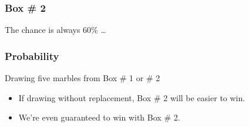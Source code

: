\documentclass[handout]{beamer}
\begin{document}


   \begin{frame}
   \frametitle{Box \# 2}
   \begin{center}
   \end{center}
   The chance is always 60\% \dots
   \end{frame}


   \begin{frame} \frametitle{Probability}

   \begin{block}
   {Drawing five marbles from Box \# 1 or \# 2}
   \begin{itemize}
     \item If drawing without replacement, Box \# 2 will be easier to win.
     \item We're even guaranteed to win with Box \# 2.
   \end{itemize}
   \end{block}
   \end{frame}

\end{document}
